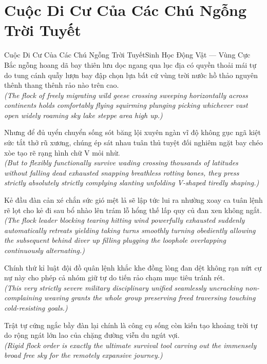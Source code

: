 \section{Cuộc Di Cư Của Các Chú Ngỗng Trời Tuyết}
\begin{truyen}{Cuộc Di Cư Của Các Chú Ngỗng Trời Tuyết}{Sinh Học Động Vật --- Vùng Cực Bắc}
 ngỗng hoang dã bay thiên lưu dọc ngang qua lục địa có quyền thoải mái tự do tung cánh quẫy lượn bay đập chọn lựa bất cứ vùng trời nước hồ thảo nguyên thênh thang thênh rảo nào trên cao.\\[4pt]
\textit{(The flock of freely migrating wild geese crossing sweeping horizontally across continents holds comfortably flying squirming plunging picking whichever vast open widely roaming sky lake steppe area high up.)}

Nhưng để đủ uyển chuyển sống sót băng lội xuyên ngàn vĩ độ không gục ngã kiệt sức tắt thở rũ xương, chúng ép sát nhau tuân thủ tuyệt đối nghiêm ngặt bay chéo xòe tạo rẽ rạng hình chữ V mỏi nhừ.\\[4pt]
\textit{(But to flexibly functionally survive wading crossing thousands of latitudes without falling dead exhausted snapping breathless rotting bones, they press strictly absolutely strictly complying slanting unfolding V-shaped tiredly shaping.)}

Kẻ đầu đàn cản xé chắn sức gió mệt lả sẽ lập tức lui ra nhường xoay ca tuân lệnh rẽ lọt cho kẻ đi sau bổ nhào lên trám lỗ hổng thế lấp quy củ đan xen không ngắt.\\[4pt]
\textit{(The flock leader blocking tearing hitting wind powerfully exhausted suddenly automatically retreats yielding taking turns smoothly turning obediently allowing the subsequent behind diver up filling plugging the loophole overlapping continuously alternating.)}

Chính thứ kỉ luật đội đồ quân lệnh khắc khe đồng lòng đan dệt không rạn nứt cự nự này cho phép cả nhóm giữ tự do tiến rảo chạm mục tiêu tránh rét.\\[4pt]
\textit{(This very strictly severe military disciplinary unified seamlessly uncracking non-complaining weaving grants the whole group preserving freed traversing touching cold-resisting goals.)}

\end{truyen}
\begin{baihoc}
  Trật tự cứng ngắc bầy đàn lại chính là công cụ sống còn kiến tạo khoảng trời tự do rộng ngát lớn lao của chặng đường viễn du ngút vợi.\\[4pt]
  \textit{(Rigid flock order is exactly the ultimate survival tool carving out the immensely broad free sky for the remotely expansive journey.)}
\end{baihoc}


